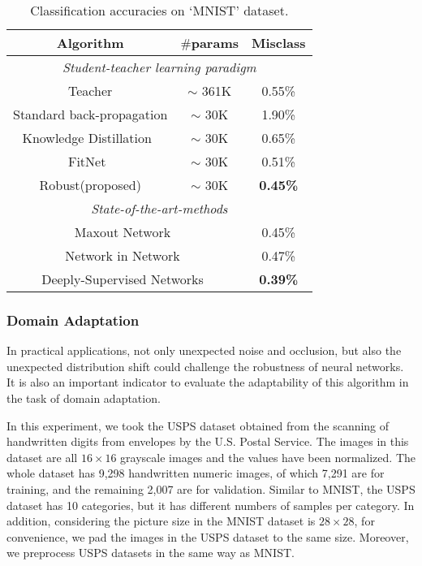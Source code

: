 \documentclass[journal]{IEEEtran}
\begin{document}
\begin{table}[hb]
\renewcommand\arraystretch{1}
\centering
\small
\setlength{\abovecaptionskip}{0.2cm}
\setlength{\belowcaptionskip}{0.2cm}
\caption{Classification accuracies on `MNIST' dataset.}
\begin{tabular}{|c|c|c|}
\hline
\textbf{Algorithm}  &  \textbf{$\#$\textbf{params}}  &  \textbf{\textbf{Misclass}} \\
\hline
\hline
\multicolumn{3}{|c|}{\emph{Student-teacher learning paradigm}} \\
\hline
\hline
Teacher  &  $\sim$ 361K  &  0.55\%  \\
\hline
Standard back-propagation  &  $\sim$ 30K  &  1.90\%  \\
\hline
Knowledge Distillation~\cite{hinton2015distilling}   &  $\sim$ 30K  &  0.65\%  \\
\hline
FitNet~\cite{romero2014fitnets}  &  $\sim$ 30K  &  0.51\%  \\
\hline
Robust(proposed)  &  $\sim$ 30K  &  \textbf{0.45\%}  \\
\hline
\hline
\multicolumn{3}{|c|}{\emph{State-of-the-art-methods}} \\
\hline
\hline
\multicolumn{2}{|c|}{Maxout Network~\cite{goodfellow2013maxout}}  &  0.45\% \\
\hline
\multicolumn{2}{|c|}{Network in Network~\cite{lin2013network}}  &  0.47\% \\
\hline
\multicolumn{2}{|c|}{Deeply-Supervised Networks~\cite{lee2015deeply}}  &  \textbf{0.39\%} \\
\hline
\end{tabular}
\label{tab_mnist}
\end{table}

\subsubsection{Domain Adaptation}
In practical applications, not only unexpected noise and occlusion, but also the unexpected distribution shift could challenge the robustness of neural networks. It is also an important indicator to evaluate the adaptability of this algorithm in the task of domain adaptation. 

In this experiment, we took the USPS dataset obtained from the scanning of handwritten digits from envelopes by the U.S. Postal Service. The images in this dataset are all $16\times16$ grayscale images and the values have been normalized. The whole dataset has 9,298 handwritten numeric images, of which 7,291 are for training, and the remaining 2,007 are for validation. Similar to MNIST, the USPS dataset has 10 categories, but it has different numbers of samples per category. In addition, considering the picture size in the MNIST dataset is $28\times28$, for convenience, we pad the images in the USPS dataset to the same size. Moreover, we preprocess USPS datasets in the same way as MNIST.
\end{document}
